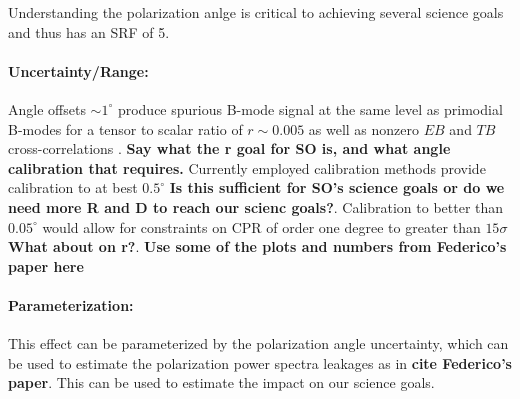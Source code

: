Understanding the polarization anlge is critical to achieving several science
goals and thus has an SRF of 5.

\paragraph{Uncertainty/Range:}

Angle offsets $\sim 1^{\circ}$ produce spurious B-mode signal at the same level
as primodial B-modes for a tensor to scalar ratio of $r \sim 0.005$ as well as
nonzero $EB$ and $TB$ cross-correlations \cite{doi:10.1142/S0218271816400125}.
\textbf{Say what the r goal for SO is, and what angle calibration that
requires.} Currently employed calibration methods provide calibration to at
best $0.5^{\circ}$ \cite{2016MNRAS.455.1981K} \textbf{Is this sufficient for
SO's science goals or do we need more R and D to reach our scienc goals?}.
Calibration to better than $0.05^{\circ}$ would allow for constraints on CPR of
order one degree to greater than $15\sigma$ \cite{2016MNRAS.455.1981K}
\textbf{What about on r?}.  \textbf{Use some of the plots and numbers from
Federico's paper here}

\paragraph{Parameterization:}
This effect can be parameterized by the polarization angle uncertainty, which
can be used to estimate the polarization power spectra leakages as in
\textbf{cite Federico's paper}. This can be used to estimate the impact on our
science goals.
